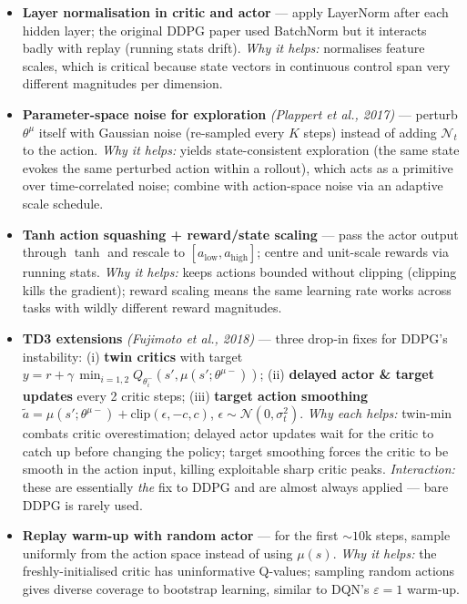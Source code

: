 \documentclass[11pt]{article}
\begin{document}
\begin{itemize}
\item
  \label{trick-4-5-1}\textbf{Layer normalisation in
  critic and actor} --- apply LayerNorm after each hidden layer; the
  original DDPG paper used BatchNorm but it interacts badly with replay
  (running stats drift). \emph{Why it helps:} normalises feature scales,
  which is critical because state vectors in continuous control span
  very different magnitudes per dimension.
\item
  \label{trick-4-5-2}\textbf{Parameter-space noise for
  exploration} \emph{(Plappert et al., 2017)} --- perturb \(\theta^\mu\)
  itself with Gaussian noise (re-sampled every \(K\) steps) instead of
  adding \(\mathcal{N}_t\) to the action. \emph{Why it helps:} yields
  state-consistent exploration (the same state evokes the same perturbed
  action within a rollout), which acts as a primitive over
  time-correlated noise; combine with action-space noise via an adaptive
  scale schedule.
\item
  \label{trick-4-5-3}\textbf{Tanh action squashing +
  reward/state scaling} --- pass the actor output through \(\tanh\) and
  rescale to \([a_\text{low}, a_\text{high}]\); centre and unit-scale
  rewards via running stats. \emph{Why it helps:} keeps actions bounded
  without clipping (clipping kills the gradient); reward scaling means
  the same learning rate works across tasks with wildly different reward
  magnitudes.
\item
  \label{trick-4-5-4}\textbf{TD3 extensions}
  \emph{(Fujimoto et al., 2018)} --- three drop-in fixes for DDPG's
  instability: (i) \textbf{twin critics} with target
  \(y = r + \gamma\,\min_{i=1,2} Q_{\theta_i^-}(s', \mu(s';\theta^{\mu-}))\);
  (ii) \textbf{delayed actor \& target updates} every 2 critic steps;
  (iii) \textbf{target action smoothing}
  \(\tilde a = \mu(s';\theta^{\mu-}) + \mathrm{clip}(\epsilon, -c, c)\),
  \(\epsilon\sim\mathcal{N}(0,\sigma_t^2)\). \emph{Why each helps:}
  twin-min combats critic overestimation; delayed actor updates wait for
  the critic to catch up before changing the policy; target smoothing
  forces the critic to be smooth in the action input, killing
  exploitable sharp critic peaks. \emph{Interaction:} these are
  essentially \emph{the} fix to DDPG and are almost always applied ---
  bare DDPG is rarely used.
\item
  \label{trick-4-5-5}\textbf{Replay warm-up with random
  actor} --- for the first \(\sim\!10\text{k}\) steps, sample uniformly
  from the action space instead of using \(\mu(s)\). \emph{Why it
  helps:} the freshly-initialised critic has uninformative Q-values;
  sampling random actions gives diverse coverage to bootstrap learning,
  similar to DQN's \(\varepsilon\!=\!1\) warm-up.
\end{itemize}
\end{document}
